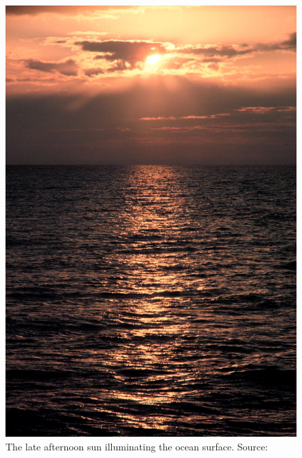 \begin{figure}
\centering
\includegraphics[scale=0.75]{figures/ocean300.jpg}
\caption{The late afternoon sun illuminating the ocean surface. Source:~\cite{misc:noaa}}
\end{figure}
%
